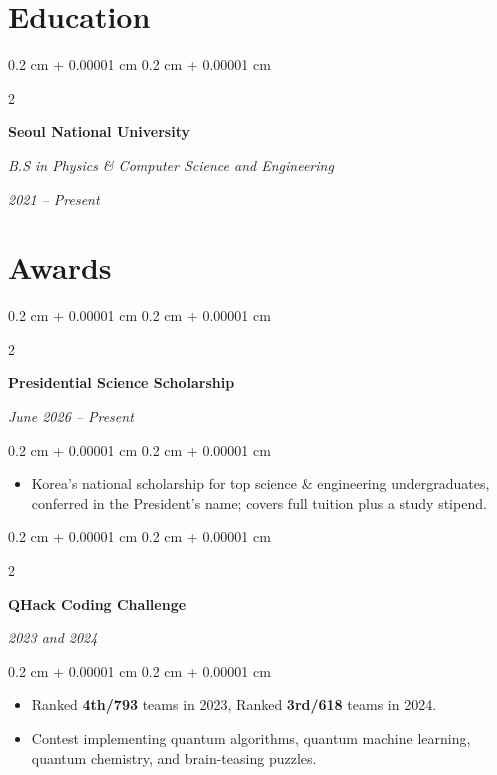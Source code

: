 \documentclass[10pt, letterpaper]{article}
\newenvironment{highlights}{
    \begin{itemize}[
        topsep=0.10 cm,
        parsep=0.10 cm,
        partopsep=0pt,
        itemsep=0pt,
        leftmargin=0.4 cm + 10pt
    ]
}{
    \end{itemize}
} %
\newenvironment{onecolentry}{
    \begin{adjustwidth}{
        0.2 cm + 0.00001 cm
    }{
        0.2 cm + 0.00001 cm
    }
}{
    \end{adjustwidth}
} %
\newenvironment{twocolentry}[2][]{
    \onecolentry
    \def\secondColumn{#2}
    \setcolumnwidth{\fill, 4.5 cm}
    \begin{paracol}{2}
}{
    \switchcolumn \raggedleft \secondColumn
    \end{paracol}
    \endonecolentry
} %
\let\hrefWithoutArrow\href
\renewcommand{\href}[2]{\hrefWithoutArrow{#1}{\ifthenelse{\equal{#2}{}}{ }{#2 }\raisebox{.15ex}{\footnotesize \faExternalLink*}}}
\begin{document}
\section{Education}

\begin{twocolentry}{
        \textit{2021 – Present}
    }
    \textbf{Seoul National University}

    \textit{B.S in Physics \& Computer Science and Engineering}
\end{twocolentry}


\section{Awards}

\begin{twocolentry}{
        \textit{June 2026 – Present}
    }
    \textbf{Presidential Science Scholarship}
\end{twocolentry}

\vspace{0.10 cm}
\begin{onecolentry}
    \begin{highlights}
        \item Korea's national scholarship for top science \& engineering undergraduates, conferred in the President's name; covers full tuition plus a study stipend.
    \end{highlights}
\end{onecolentry}

\vspace{0.2 cm}

\begin{twocolentry}{
        \textit{2023 and 2024}
    }
    \textbf{QHack Coding Challenge \href{https://qhack.ai}{[link]}}
\end{twocolentry}

\vspace{0.10 cm}
\begin{onecolentry}
    \begin{highlights}
        \item Ranked \textbf{4th/793} teams in 2023, Ranked \textbf{3rd/618} teams in 2024.
        \item Contest implementing quantum algorithms, quantum machine learning, quantum chemistry, and brain-teasing puzzles.
    \end{highlights}
\end{onecolentry}

\vspace{0.2 cm}
\end{document}
